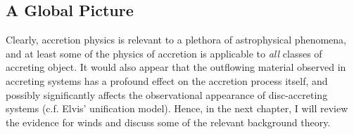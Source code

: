 \subsection{A Global Picture}

Clearly, accretion physics is relevant to a plethora of astrophysical phenomena, 
and at least some of the physics of accretion is applicable to {\em all} 
classes of accreting object. 
It would also appear that the outflowing material observed in accreting systems 
has a profound effect on the accretion process itself, and 
possibly significantly affects the observational 
appearance of disc-accreting systems (c.f. Elvis' unification model). 
Hence, in the next chapter, I will review the evidence for
winds and discuss some of the relevant background theory.

